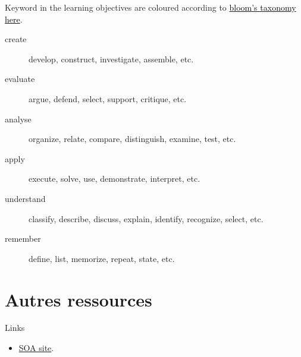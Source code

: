 Keyword in the learning objectives are coloured according to \href{https://cft.vanderbilt.edu/guides-sub-pages/blooms-taxonomy/}{\textcolor{black}{bloom's taxonomy here}}.
\begin{description}
	\item[\textcolor{amaranth}{create}]	develop, construct, investigate, assemble, etc.
	\item[\textcolor{amber}{evaluate}]	argue, defend, select, support, critique, etc.
	\item[\textcolor{applegreen}{analyse}]	organize, relate, compare, distinguish, examine, test, etc.
	\item[\textcolor{ao(english)}{apply}]	execute, solve, use, demonstrate, interpret, etc.
	\item[\textcolor{babyblue}{understand}]	classify, describe, discuss, explain, identify, recognize, select, etc.
	\item[\textcolor{blue(pigment)}{remember}]	define, list, memorize, repeat, state, etc.
\end{description}

\clearpage

\section{Autres ressources}
\begin{FORMULA_SUMM}{Links}
\begin{itemize}
	\item	\href{https://www.soa.org/education/exam-req/edu-exam-stam-detail/}{SOA site}.
\end{itemize}
\end{FORMULA_SUMM}